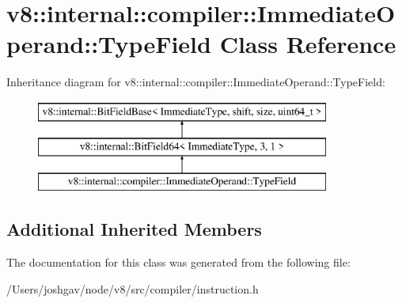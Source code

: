\hypertarget{classv8_1_1internal_1_1compiler_1_1_immediate_operand_1_1_type_field}{}\section{v8\+:\+:internal\+:\+:compiler\+:\+:Immediate\+Operand\+:\+:Type\+Field Class Reference}
\label{classv8_1_1internal_1_1compiler_1_1_immediate_operand_1_1_type_field}
Inheritance diagram for v8\+:\+:internal\+:\+:compiler\+:\+:Immediate\+Operand\+:\+:Type\+Field\+:\begin{figure}[H]
\begin{center}
\leavevmode
\includegraphics[height=3.000000cm]{classv8_1_1internal_1_1compiler_1_1_immediate_operand_1_1_type_field}
\end{center}
\end{figure}
\subsection*{Additional Inherited Members}


The documentation for this class was generated from the following file\+:\begin{DoxyCompactItemize}
\item 
/\+Users/joshgav/node/v8/src/compiler/instruction.\+h\end{DoxyCompactItemize}

